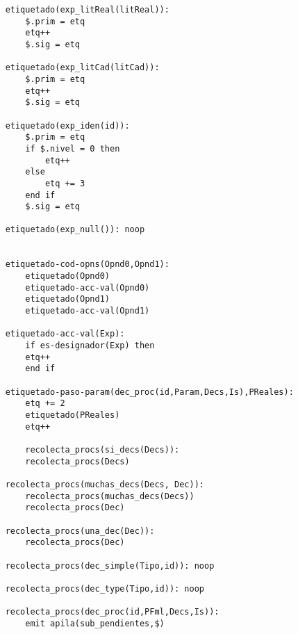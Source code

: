 \begin{lstlisting}
    etiquetado(exp_litReal(litReal)):
        $.prim = etq
        etq++
        $.sig = etq

    etiquetado(exp_litCad(litCad)):
        $.prim = etq
        etq++
        $.sig = etq

    etiquetado(exp_iden(id)):
        $.prim = etq
        if $.nivel = 0 then
            etq++
        else
            etq += 3
        end if
        $.sig = etq

    etiquetado(exp_null()): noop


    etiquetado-cod-opns(Opnd0,Opnd1):
        etiquetado(Opnd0)
        etiquetado-acc-val(Opnd0)
        etiquetado(Opnd1)
        etiquetado-acc-val(Opnd1)

    etiquetado-acc-val(Exp):
        if es-designador(Exp) then
        etq++
        end if

    etiquetado-paso-param(dec_proc(id,Param,Decs,Is),PReales):
        etq += 2
        etiquetado(PReales)
        etq++

        recolecta_procs(si_decs(Decs)):
        recolecta_procs(Decs)

    recolecta_procs(muchas_decs(Decs, Dec)):
        recolecta_procs(muchas_decs(Decs))
        recolecta_procs(Dec)
    
    recolecta_procs(una_dec(Dec)):
        recolecta_procs(Dec)

    recolecta_procs(dec_simple(Tipo,id)): noop

    recolecta_procs(dec_type(Tipo,id)): noop

    recolecta_procs(dec_proc(id,PFml,Decs,Is)): 
        emit apila(sub_pendientes,$)

\end{lstlisting}

